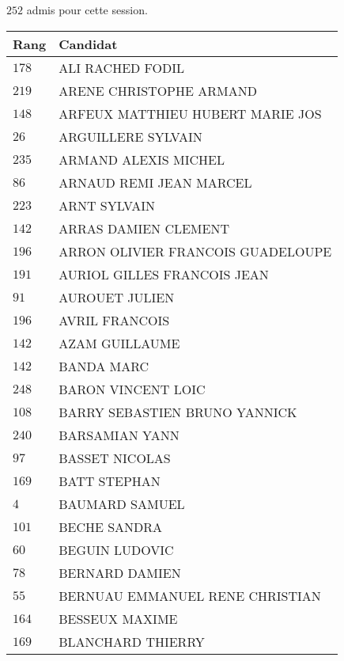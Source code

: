 




  $252$ admis pour cette session.

  \begin{xltabular}{\linewidth}{|l|X|}
    \hline
    \textbf{Rang} & \textbf{Candidat} \\
    \hline
    $178$ & ALI RACHED FODIL \\
    \hline
    $219$ & ARENE CHRISTOPHE ARMAND \\
    \hline
    $148$ & ARFEUX MATTHIEU HUBERT MARIE JOS \\
    \hline
    $26$ & ARGUILLERE SYLVAIN \\
    \hline
    $235$ & ARMAND ALEXIS MICHEL \\
    \hline
    $86$ & ARNAUD REMI JEAN MARCEL \\
    \hline
    $223$ & ARNT SYLVAIN \\
    \hline
    $142$ & ARRAS DAMIEN CLEMENT \\
    \hline
    $196$ & ARRON OLIVIER FRANCOIS GUADELOUPE \\
    \hline
    $191$ & AURIOL GILLES FRANCOIS JEAN \\
    \hline
    $91$ & AUROUET JULIEN \\
    \hline
    $196$ & AVRIL FRANCOIS \\
    \hline
    $142$ & AZAM GUILLAUME \\
    \hline
    $142$ & BANDA MARC \\
    \hline
    $248$ & BARON VINCENT LOIC \\
    \hline
    $108$ & BARRY SEBASTIEN BRUNO YANNICK \\
    \hline
    $240$ & BARSAMIAN YANN \\
    \hline
    $97$ & BASSET NICOLAS \\
    \hline
    $169$ & BATT STEPHAN \\
    \hline
    $4$ & BAUMARD SAMUEL \\
    \hline
    $101$ & BECHE SANDRA \\
    \hline
    $60$ & BEGUIN LUDOVIC \\
    \hline
    $78$ & BERNARD DAMIEN \\
    \hline
    $55$ & BERNUAU EMMANUEL RENE CHRISTIAN \\
    \hline
    $164$ & BESSEUX MAXIME \\
    \hline
    $169$ & BLANCHARD THIERRY \\

\end{xltabular}
